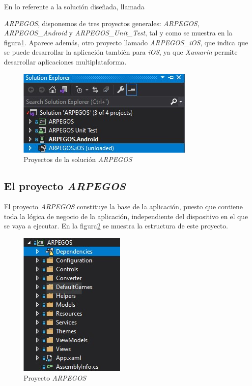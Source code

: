 En lo referente a la solución diseñada, llamada {\textit{ARPEGOS}, disponemos de tres proyectos generales: \textit{ARPEGOS}, 
\textit{ARPEGOS\_Android} y \textit{ARPEGOS\_Unit\_Test}, tal y como se muestra en la figura\ref*{SolutionProjects}. Aparece además, 
otro proyecto llamado \textit{ARPEGOS\_iOS}, que indica que se puede desarrollar la aplicación también para \textit{iOS}, ya 
que \textit{Xamarin} permite desarrollar aplicaciones multiplataforma.


\begin{figure}[H]
    \centering
    \includegraphics[scale=1.5]{Images/Solution_Projects.jpg}
    \caption{Proyectos de la solución \textit{ARPEGOS}}
    \label{SolutionProjects}    
\end{figure}

\subsection{El proyecto \textit{ARPEGOS}}
El proyecto \textit{ARPEGOS} constituye la base de la aplicación, puesto que contiene toda la lógica de negocio de la aplicación, 
independiente del dispositivo en el que se vaya a ejecutar. En la figura\ref*{SolutionARPEGOS} se muestra la estructura de este proyecto.

\begin{figure}[H]
    \centering
    \includegraphics[scale=1.5]{Images/Solution_ARPEGOS_Project.jpg}
    \caption{Proyecto \textit{ARPEGOS}}
    \label{SolutionARPEGOS}    
\end{figure}

}
